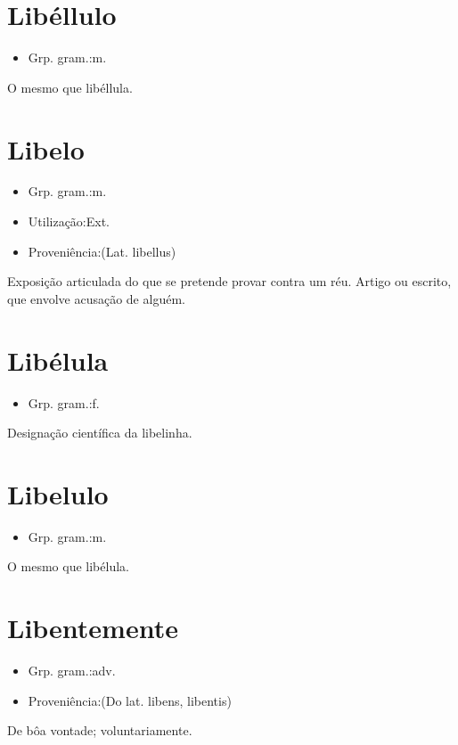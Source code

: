 \section{Libéllulo}
\begin{itemize}
\item {Grp. gram.:m.}
\end{itemize}
O mesmo que \textunderscore libéllula\textunderscore .
\section{Libelo}
\begin{itemize}
\item {Grp. gram.:m.}
\end{itemize}
\begin{itemize}
\item {Utilização:Ext.}
\end{itemize}
\begin{itemize}
\item {Proveniência:(Lat. \textunderscore libellus\textunderscore )}
\end{itemize}
Exposição articulada do que se pretende provar contra um réu.
Artigo ou escrito, que envolve acusação de alguém.
\section{Libélula}
\begin{itemize}
\item {Grp. gram.:f.}
\end{itemize}
Designação científica da \textunderscore libelinha\textunderscore .
\section{Libelulo}
\begin{itemize}
\item {Grp. gram.:m.}
\end{itemize}
O mesmo que \textunderscore libélula\textunderscore .
\section{Libentemente}
\begin{itemize}
\item {Grp. gram.:adv.}
\end{itemize}
\begin{itemize}
\item {Proveniência:(Do lat. \textunderscore libens\textunderscore , \textunderscore libentis\textunderscore )}
\end{itemize}
De bôa vontade; voluntariamente.
